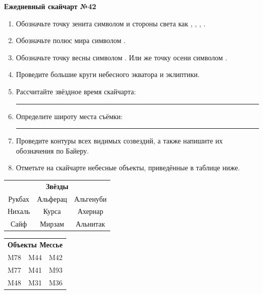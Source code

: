 \documentclass{./SAS-class-skygen}
\begin{document}
    
    
    
	\begin{center}
		\large\textbf{Ежедневный скайчарт №42}
	\end{center}

	\begin{enumerate}
		\item Обозначьте точку зенита символом  и стороны света как , , , .
		\item Обозначьте полюс мира символом .
		\item Обозначьте точку весны символом \Aries. Или же точку осени символом \Libra.
		\item Проведите большие круги небесного экватора и эклиптики.
		\item Рассчитайте звёздное время скайчарта: \rule{2cm}{0.4pt}
		\item Определите широту места съёмки: \rule{2cm}{0.4pt}
		\item Проведите контуры всех видимых созвездий, а также напишите их обозначения по Байеру.
		\item Отметьте на скайчарте небесные объекты, приведённые в таблице ниже.
	\end{enumerate}
	
    \vspace{0.5cm}

    \begin{table}[h!]
    \centering
    \begin{tabular}{ccc}
    \multicolumn{3}{c}{\textbf{Звёзды}} \\ Рукбах & Альферац & Альгенуби \\
Нихаль & Курса & Ахернар \\
Сайф & Мирзам & Альнитак \\

\end{tabular}
    \hfill
    \begin{tabular}{ccc}
    \multicolumn{3}{c}{\textbf{Объекты Мессье}} \\ M78 & M44 & M42 \\
M77 & M41 & M93 \\
M48 & M31 & M36 \\

\end{tabular}
    \end{table}
	
\end{document}
